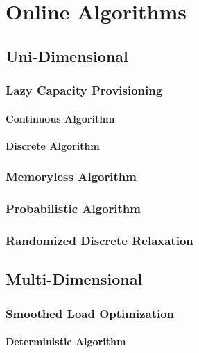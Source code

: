 
\chapter{Online Algorithms}\label{chapter:algorithms}

\section{Uni-Dimensional}

\subsection{Lazy Capacity Provisioning}

\subsubsection{Continuous Algorithm}

\subsubsection{Discrete Algorithm}

\subsection{Memoryless Algorithm}

\subsection{Probabilistic Algorithm}

\subsection{Randomized Discrete Relaxation}

\section{Multi-Dimensional}

\subsection{Smoothed Load Optimization}

\subsubsection{Deterministic Algorithm}

